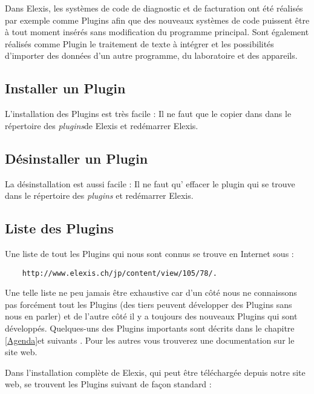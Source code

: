 Dans Elexis, les systèmes de code de diagnostic et de facturation ont été réalisés par exemple comme Plugins afin que des nouveaux systèmes de code puissent être à tout moment insérés sans modification du programme principal. Sont également réalisés comme Plugin le traitement de texte à intégrer et les possibilités d'importer des données d'un autre programme, du laboratoire et des appareils.

\subsection{Installer un Plugin}
L'installation des Plugins est très facile : Il ne faut que le copier dans dans le répertoire des \textit{plugins}de Elexis et redémarrer Elexis.

\subsection{Désinstaller un Plugin}
La désinstallation est aussi facile : Il ne faut qu' effacer le plugin  qui se trouve dans le répertoire des  \textit{plugins} et redémarrer Elexis.

\subsection{Liste des Plugins}
Une liste de tout les Plugins qui nous sont connus se trouve en Internet sous :
\begin{verbatim}
    http://www.elexis.ch/jp/content/view/105/78/.
\end{verbatim}
Une telle liste ne peu jamais être exhaustive car d'un côté nous ne connaissons pas forcément tout les Plugins (des tiers peuvent développer des Plugins sans nous en parler) et de l'autre côté il y a toujours des nouveaux Plugins qui sont développés. Quelques-uns des Plugins importants sont décrits dans le chapitre \ref{Agenda}et suivants . Pour les autres vous trouverez une documentation sur le site web.


\medskip

Dans l'installation complète de Elexis, qui peut être téléchargée depuis notre site web, se trouvent les Plugins suivant de façon standard :

